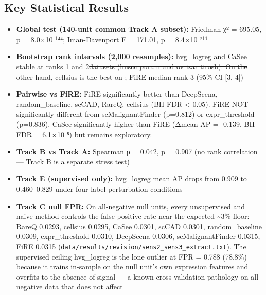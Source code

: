 \documentclass[10pt]{article}
\providecommand{\DIFaddtex}[1]{{\protect\color{trackgreen}#1}} %
\providecommand{\DIFdeltex}[1]{{\protect\color{red}\sout{#1}}}                      %
\providecommand{\DIFaddbegin}{} %
\providecommand{\DIFaddend}{} %
\providecommand{\DIFdelbegin}{} %
\providecommand{\DIFdelend}{} %
\providecommand{\DIFadd}[1]{\texorpdfstring{\DIFaddtex{#1}}{#1}} %
\providecommand{\DIFdel}[1]{\texorpdfstring{\DIFdeltex{#1}}{}} %
\newcommand{\DIFscaledelfig}{0.5}
\newlength{\DIFdelgraphicswidth} %
\newlength{\DIFdelgraphicsheight} %
\newcommand{\DIFaddincludegraphics}[2][]{{\color{trackgreen}\fbox{\DIFOincludegraphics[#1]{#2}}}} %
\newcommand{\DIFdelincludegraphics}[2][]{%
\sbox{\DIFdelgraphicsbox}{\DIFOincludegraphics[#1]{#2}}%
\settoboxwidth{\DIFdelgraphicswidth}{\DIFdelgraphicsbox} %
\settoboxtotalheight{\DIFdelgraphicsheight}{\DIFdelgraphicsbox} %
\scalebox{\DIFscaledelfig}{%
\parbox[b]{\DIFdelgraphicswidth}{\usebox{\DIFdelgraphicsbox}\\[-\baselineskip] \rule{\DIFdelgraphicswidth}{0em}}\llap{\resizebox{\DIFdelgraphicswidth}{\DIFdelgraphicsheight}{%
\setlength{\unitlength}{\DIFdelgraphicswidth}%
\begin{picture}(1,1)%
\thicklines\linethickness{2pt} %
{\color[rgb]{1,0,0}\put(0,0){\framebox(1,1){}}}%
{\color[rgb]{1,0,0}\put(0,0){\line( 1,1){1}}}%
{\color[rgb]{1,0,0}\put(0,1){\line(1,-1){1}}}%
\end{picture}%
}\hspace*{3pt}}} %
} %
\DeclareRobustCommand{\DIFaddbegin}{\DIFOaddbegin \let\includegraphics\DIFaddincludegraphics} %
\DeclareRobustCommand{\DIFaddend}{\DIFOaddend \let\includegraphics\DIFOincludegraphics} %
\DeclareRobustCommand{\DIFdelbegin}{\DIFOdelbegin \let\includegraphics\DIFdelincludegraphics} %
\DeclareRobustCommand{\DIFdelend}{\DIFOaddend \let\includegraphics\DIFOincludegraphics} %
\providecommand{\tightlist}{\setlength{\itemsep}{0pt}\setlength{\parskip}{0pt}}
\begin{document}
\begin{center}\DIFadd{\rule{0.5\linewidth}{0.5pt}}\end{center}

\subsection{\DIFadd{Key Statistical Results}}\label{key-statistical-results}

\begin{itemize}
\tightlist
\item
  \textbf{\DIFadd{Global test (140-unit common Track A subset):}} \DIFadd{Friedman χ² =
  695.05, p = 8.0×10⁻¹⁴⁴; Iman-Davenport F = 171.01, p = 8.4×10⁻²¹¹
}\item
  \textbf{\DIFadd{Bootstrap rank intervals (2,000 resamples):}} \DIFadd{hvg\_logreg and
  CaSee stable at ranks 1 and }\DIFaddend 2\DIFdelbegin \DIFdel{datasets (hnscc puram and
ov izar tirosh).
On the other hand, cellsius is the best on }\DIFdelend \DIFaddbegin \DIFadd{; FiRE median rank 3 (95\% CI }{[}\DIFadd{3, 4}{]}\DIFadd{)
}\item
  \textbf{\DIFadd{Pairwise vs FiRE:}} \DIFadd{FiRE significantly better than DeepScena,
  random\_baseline, scCAD, RareQ, cellsius (BH FDR \textless{} 0.05).
  FiRE NOT significantly different from scMalignantFinder (p=0.812) or
  expr\_threshold (p=0.836). CaSee significantly higher than FiRE (Δmean
  AP = -0.139, BH FDR = 6.1×10⁻⁸) but remains exploratory.
}\item
  \textbf{\DIFadd{Track B vs Track A:}} \DIFadd{Spearman ρ = 0.042, p = 0.907 (no rank
  correlation --- Track B is a separate stress test)
}\item
  \textbf{\DIFadd{Track E (supervised only):}} \DIFadd{hvg\_logreg mean AP drops from
  0.909 to 0.460--0.829 under four label perturbation conditions
}\item
  \textbf{\DIFadd{Track C null FPR:}} \DIFadd{On all-negative null units, every
  unsupervised and naive method controls the false-positive rate near
  the expected \textasciitilde3\% floor: RareQ 0.0293, cellsius 0.0295,
  CaSee 0.0301, scCAD 0.0301, random\_baseline 0.0309, expr\_threshold
  0.0310, DeepScena 0.0306, scMalignantFinder 0.0315, FiRE 0.0315
  (}\texttt{\DIFadd{data/results/revision/sens2\_sens3\_extract.txt}}\DIFadd{). The
  supervised ceiling hvg\_logreg is the lone outlier at FPR = 0.788
  (78.8\%) because it trains in-sample on the null unit's own expression
  features and overfits to the absence of signal --- a known
  cross-validation pathology on all-negative data that does not affect
}
\end{itemize}
\end{document}
